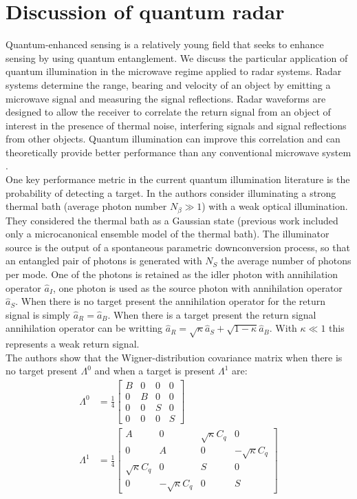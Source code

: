 \documentclass[a4paper,11pt, twocolumn]{article}
\numberwithin{equation}{section}
\begin{document}
\section{Discussion of quantum radar}
Quantum-enhanced sensing is a relatively young field that seeks to enhance sensing by using quantum entanglement. 
We discuss the particular application of quantum illumination in the microwave regime applied to radar systems.
Radar systems determine the range, bearing and velocity of an object by emitting a microwave signal and measuring the signal reflections.
Radar waveforms are designed to allow the receiver to correlate the return signal from an object of interest in the presence of thermal noise, interfering signals and signal reflections from other objects.
Quantum illumination can improve this correlation and can theoretically provide better performance than any conventional microwave system \cite{qi}\cite{qig}.
\\
One key performance metric in the current quantum illumination literature is the probability of detecting a target.
In \cite{qig} the authors consider illuminating a strong thermal bath (average photon number $N_\beta \gg 1$) with a weak optical illumination.
They considered the thermal bath as a Gaussian state (previous work included only a microcanonical ensemble model of the thermal bath).
The illuminator source is the output of a spontaneous parametric downconversion process, so that an entangled pair of photons is generated with $N_S$ the average number of photons per mode.
One of the photons is retained as the idler photon with annihilation operator $\hat{a}_I$, one photon is used as the source photon with annihilation operator $\hat{a}_S$.
When there is no target present the annihilation operator for the return signal is simply $\hat{a}_R=\hat{a}_B$. 
When there is a target present the return signal annihilation operator can be writting $\hat{a}_R = \sqrt{\kappa}\hat{a}_S+\sqrt{1-\kappa}\hat{a}_B $.
With $\kappa \ll 1$ this represents a weak return signal.
\\
The authors show that the Wigner-distribution covariance matrix when there is no target present $\Lambda^0$ and when a target is present $\Lambda^1$ are:
\begin{align}
 \Lambda^{0} &= \frac{1}{4}\begin{bmatrix}
                            B & 0 & 0 & 0\\
                            0 & B & 0 & 0\\
                            0 & 0 & S & 0\\
                            0 & 0 & 0 & S
                           \end{bmatrix}\\
  \Lambda^{1} &= \frac{1}{4}\begin{bmatrix}
                            A & 0 & \sqrt{\kappa}C_q & 0\\
                            0 & A & 0 & -\sqrt{\kappa}C_q\\
                            \sqrt{\kappa}C_q & 0 & S & 0\\
                            0 & -\sqrt{\kappa}C_q & 0 & S
                           \end{bmatrix}
\end{align}
\end{document}
